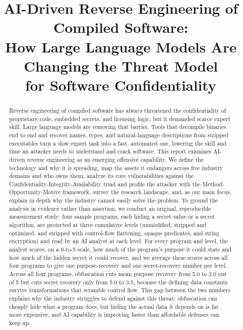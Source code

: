 \documentclass[conference]{IEEEtran}
\begin{document}
\title{AI-Driven Reverse Engineering of Compiled Software:\\
How Large Language Models Are Changing the Threat Model\\
for Software Confidentiality}

\author{
\and
{}
}

\maketitle

\begin{abstract}
Reverse engineering of compiled software has always threatened the
confidentiality of proprietary code, embedded secrets, and licensing logic, but it
demanded scarce expert skill. Large language models are removing that barrier.
Tools that decompile binaries end to end and recover names, types, and
natural-language descriptions from stripped executables turn a slow expert task
into a fast, automated one, lowering the skill and time an attacker needs to
understand and crack software. This report examines AI-driven reverse engineering
as an emerging offensive capability. We define the technology and why it is
spreading, map the assets it endangers across five industry domains and who owns
them, analyze its core vulnerabilities against the
Confidentiality-Integrity-Availability triad and profile the attacker with the
Method-Opportunity-Motive framework, survey the research landscape, and, as our
main focus, explain in depth why the industry cannot easily solve the problem. To
ground the analysis in evidence rather than assertion, we conduct an original,
reproducible measurement study: four sample programs, each hiding a secret value or
a secret algorithm, are protected at three cumulative levels (unmodified, stripped
and optimized, and stripped with control-flow flattening, opaque predicates, and
string encryption) and read by an AI analyst at each level. For every program and
level, the analyst scores, on a 0-to-5 scale, how much of the program's purpose it
could state and how much of the hidden secret it could recover, and we average
these scores across all four programs to give one purpose-recovery and one
secret-recovery number per level. Across all four programs, obfuscation cuts mean
purpose recovery from 5.0 to 2.0 out of 5 but cuts secret recovery only from 5.0 to
3.5, because the defining data constants survive transformations that scramble
control flow. This gap between the two numbers explains why the industry struggles
to defend against this threat: obfuscation can cheaply hide what a program does,
but hiding the actual data it depends on is far more expensive, and AI capability
is improving faster than affordable defenses can keep up.
\end{abstract}
\end{document}
